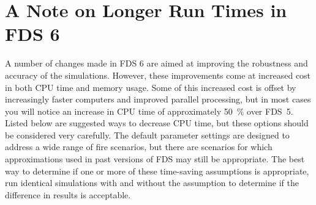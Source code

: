 \documentclass[11pt]{book}
\begin{document}
\section{A Note on Longer Run Times in FDS 6}

A number of changes made in FDS 6 are aimed at improving the robustness and accuracy of the simulations. However, these improvements come at increased cost in both CPU time and memory usage. Some of this increased cost is offset by increasingly faster computers and improved parallel processing, but in most cases you will notice an increase in CPU time of approximately 50~\% over FDS~5. Listed below are suggested ways to decrease CPU time, but these options should be considered very carefully. The default parameter settings are designed to address a wide range of fire scenarios, but there are scenarios for which approximations used in past versions of FDS may still be appropriate. The best way to determine if one or more of these time-saving assumptions is appropriate, run identical simulations with and without the assumption to determine if the difference in results is acceptable.
\end{document}
